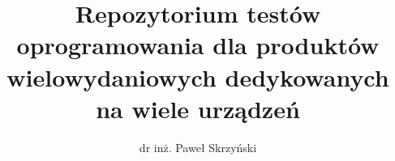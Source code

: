 \documentclass[inz]{recenzja}
\title{Repozytorium testów oprogramowania dla produktów \\ wielowydaniowych dedykowanych na wiele urządzeń}
\author{dr inż. Paweł Skrzyński}
\begin{document}
\rec
\end{document}
